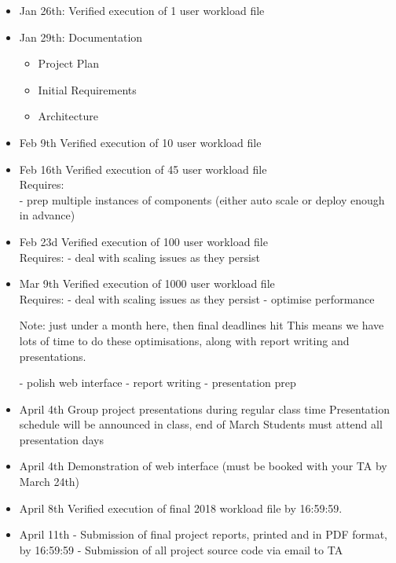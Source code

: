 \documentclass[a4paper,10pt]{article}
\begin{document}
\begin{itemize}
 \item Jan 26th: Verified execution of 1 user workload file
 \item Jan 29th: Documentation
  \begin{itemize}
	\item Project Plan
	\item Initial Requirements
	\item Architecture
  \end{itemize}
 \item Feb 9th	Verified execution of 10 user workload file
\item Feb 16th Verified execution of 45 user workload file\\
Requires:\\
- prep multiple instances of components (either auto scale or deploy enough in 
advance)

\item Feb 23d	Verified execution of 100 user workload file\\
Requires:
- deal with scaling issues as they persist

\item Mar 9th	Verified execution of 1000 user workload file\\
Requires:
- deal with scaling issues as they persist
- optimise performance

Note: just under a month here, then final deadlines hit
This means we have lots of time to do these optimisations, along with report 
writing and presentations. 

- polish web interface
- report writing
- presentation prep

\item April 4th
Group project presentations during regular class time
Presentation schedule will be announced in class, end of March
Students must attend all presentation days

\item April 4th Demonstration of web interface (must be booked with your TA by 
March 24th)

\item April 8th Verified execution of final 2018 workload file by 16:59:59.

\item April 11th
- Submission of final project reports, printed and in PDF format, by 16:59:59
- Submission of all project source code via email to TA
\end{itemize}
\end{document}
